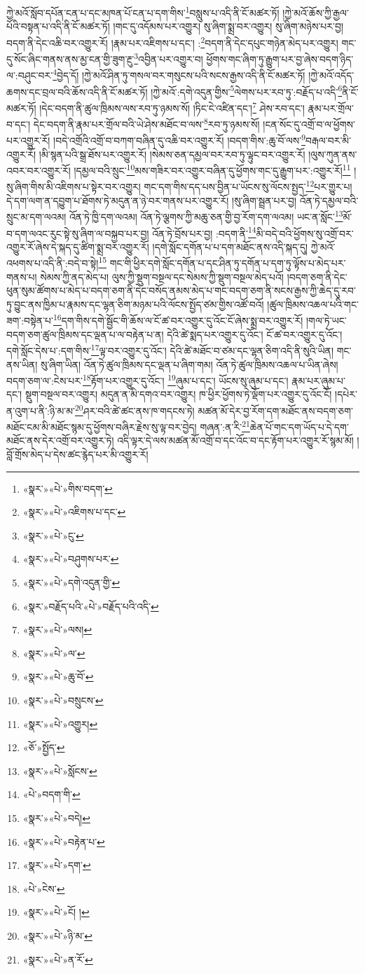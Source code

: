 ཀྱེ་མའོ་སློབ་དཔོན་ངན་པ་དང་མཁན་པོ་ངན་པ་དག་གིས་\footnote{«སྣར་»«པེ་»གིས་བདག་}བསླུས་པ་འདི་ནི་ངོ་མཚར་ཏོ། །ཀྱེ་མའོ་ཆོས་ཀྱི་རྒྱལ་པོའི་བསྟན་པ་འདི་ནི་ངོ་མཚར་ཏོ། །གང་དུ་འདོམས་པར་འགྱུར། སུ་ཞིག་སྨྲ་བར་འགྱུར། སུ་ཞིག་མཉེས་པར་བྱ། བདག་ནི་དེང་འཆི་བར་འགྱུར་རོ། །རྣམ་པར་འཇིགས་པ་དང་། :\footnote{«སྣར་»«པེ་»འཇིགས་པ་དང་}བདག་ནི་དེང་དཔུང་གཉེན་མེད་པར་འགྱུར། གང་དུ་སོང་ཞིང་གནས་ནས་མྱ་ངན་གྱི་ཟུག་རྔུ་\footnote{«སྣར་»«པེ་»ངུ་}འབྱིན་པར་འགྱུར་བ། ཕྱོགས་གང་ཞིག་ཏུ་རྒྱུག་པར་བྱ་ཞེས་བདག་ཉིད་ལ་:བཤུང་བར་\footnote{«སྣར་»«པེ་»བཤུགས་པར་}བྱེད་དོ། །ཀྱེ་མའོ་ཤིན་ཏུ་གསལ་བར་གསུངས་པའི་སངས་རྒྱས་འདི་ནི་ངོ་མཚར་ཏོ། །ཀྱེ་མའོ་འདོད་ཆགས་དང་བྲལ་བའི་ཆོས་འདི་ནི་ངོ་མཚར་ཏོ། །ཀྱེ་མའོ་:དགེ་འདུན་གྱིས་\footnote{«སྣར་»«པེ་»དགེ་འདུན་གྱི་}ལེགས་པར་རབ་ཏུ་:བརྗོད་པ་འདི་\footnote{«སྣར་»བརྗོད་པའི་«པེ་»བརྗོད་པའི་འདི་}ནི་ངོ་མཚར་ཏོ། །དེང་བདག་ནི་ཚུལ་ཁྲིམས་ལས་རབ་ཏུ་ཉམས་སོ། །ཏིང་ངེ་འཛིན་དང་།\footnote{«སྣར་»«པེ་»ལས།} ཤེས་རབ་དང་། རྣམ་པར་གྲོལ་བ་དང་། དེང་བདག་ནི་རྣམ་པར་གྲོལ་བའི་ཡེ་ཤེས་མཐོང་བ་ལས་\footnote{«སྣར་»«པེ་»ལ་}རབ་ཏུ་ཉམས་སོ། །ངན་སོང་དུ་འགྲོ་བ་ལ་ཕྱོགས་པར་འགྱུར་རོ། །བདེ་འགྲོའི་འགྲོ་བ་བཀག་བཞིན་དུ་འཆི་བར་འགྱུར་རོ། །བདག་གིས་:ཆུ་བོ་ལས་\footnote{«སྣར་»«པེ་»ཆུ་བོ་}བརྒལ་བར་མི་འགྱུར་རོ། །མི་སྙན་པའི་སྒྲ་ཐོས་པར་འགྱུར་རོ། །སེམས་ཅན་དམྱལ་བར་རབ་ཏུ་ལྟུང་བར་འགྱུར་རོ། །ལུས་ཀུན་ནས་འབར་བར་འགྱུར་རོ། །དམྱལ་བའི་སྲུང་\footnote{«སྣར་»«པེ་»བསྲུངས་}མས་གཟིར་བར་འགྱུར་བཞིན་དུ་ཕྱོགས་གང་དུ་རྒྱུག་པར་:འགྱུར་རོ།\footnote{«སྣར་»«པེ་»འགྱུར།} །སུ་ཞིག་གིས་མི་འཇིགས་པ་སྟེར་བར་འགྱུར། གང་དག་གིས་དད་པས་བྱིན་པ་ཡོངས་སུ་ལོངས་སྤྱད་\footnote{«ཅོ་»སྤྱོད་}པར་གྱུར་པ། དེ་དག་ལག་ན་དབྱུག་པ་ཐོགས་ཏེ་མདུན་ན་ཉེ་བར་གནས་པར་འགྱུར་རོ། །སུ་ཞིག་སྦྲན་པར་བྱ། འོན་ཏེ་དམྱལ་བའི་སྲུང་མ་དག་ལའམ། འོན་ཏེ་ཁྱི་དག་ལའམ། འོན་ཏེ་ལྕགས་ཀྱི་མཆུ་ཅན་གྱི་བྱ་རོག་དག་ལའམ། ཡང་ན་སློང་\footnote{«སྣར་»«པེ་»སློངས་}མོ་བ་དག་ལའང་རུང་སྟེ་སུ་ཞིག་ལ་བསྐྱབ་པར་བྱ། འོན་ཏེ་བྲོས་པར་བྱ། :བདག་ནི་\footnote{«པེ་»བདག་གི་}མི་བདེ་བའི་ཕྱོགས་སུ་འགྲོ་བར་འགྱུར་རོ་ཞེས་དེ་སྐད་དུ་ཚིག་སྨྲ་བར་འགྱུར་རོ། །དགེ་སློང་དགོན་པ་པ་དག་མཐོང་ནས་འདི་སྐད་དུ། ཀྱེ་མའོ་འཕགས་པ་འདི་ནི་:བདེ་བ་སྟེ།\footnote{«སྣར་»«པེ་»བདེ།} གང་གི་ཕྱིར་དགེ་སློང་དགོན་པ་དང་ཤིན་ཏུ་དགོན་པ་དག་ཏུ་ལྟོས་པ་མེད་པར་གནས་པ། སེམས་ཀྱི་ནད་མེད་པ། ལུས་ཀྱི་སྡུག་བསྔལ་དང་སེམས་ཀྱི་སྡུག་བསྔལ་མེད་པའོ། །བདག་ཅག་ནི་དེང་ཕུན་སུམ་ཚོགས་པ་མེད་པ་བདག་ཅག་ནི་དེང་བསོད་ནམས་མེད་པ་གང་བདག་ཅག་ནི་སངས་རྒྱས་ཀྱི་ཆེད་དུ་རབ་ཏུ་བྱུང་ནས་ཁྱིམ་པ་རྣམས་དང་ལྷན་ཅིག་མཉམ་པའི་ལོངས་སྤྱོད་ཙམ་གྱིས་འཚོ་བའོ། །ཚུལ་ཁྲིམས་འཆལ་པའི་གང་ཟག་:བསྟེན་པ་\footnote{«སྣར་»«པེ་»བརྟེན་པ་}དག་གིས་དགེ་སྦྱོང་གི་ཆོས་ལ་ངོ་ཚ་བར་འགྱུར་དུ་འོང་ངོ་ཞེས་སྨྲ་བར་འགྱུར་རོ། །གལ་ཏེ་ཡང་བདག་ཅག་ཚུལ་ཁྲིམས་དང་ལྡན་པ་ལ་བརྟེན་པ་ན། དེའི་ཚེ་སྨད་པར་འགྱུར་དུ་འོང་། ངོ་ཚ་བར་འགྱུར་དུ་འོང་། དགེ་སློང་དེས་པ་:དག་གིས་\footnote{«སྣར་»«པེ་»དག་}ལྟ་བར་འགྱུར་དུ་འོང་། དེའི་ཚེ་མཐོང་བ་ཙམ་དང་ལྷན་ཅིག་འདི་ནི་སུའི་ཡིན། གང་ནས་ཡིན། སུ་ཞིག་ཡིན། འོན་ཏེ་ཚུལ་ཁྲིམས་དང་ལྡན་པ་ཞིག་གམ། འོན་ཏེ་ཚུལ་ཁྲིམས་འཆལ་པ་ཡིན་ཞེས། བདག་ཅག་ལ་:ངེས་པར་\footnote{«པེ་»ངེས་}རྟོག་པར་འགྱུར་དུ་འོང་། \footnote{«སྣར་»«པེ་»ངོ། ། }ཞུམ་པ་དང་། ཡོངས་སུ་ཞུམ་པ་དང་། རྣམ་པར་ཞུམ་པ་དང་། སྡུག་བསྔལ་བར་འགྱུར། མདུན་ན་མི་དགའ་བར་འགྱུར། ཁ་ཕྱིར་ཕྱོགས་ཏེ་ལྡོག་པར་འགྱུར་དུ་འོང་ངོ། །དཔེར་ན་འུག་པ་ནི་:ཉི་མ་མ་\footnote{«སྣར་»«པེ་»ཉི་མ་}ཤར་བའི་ཚེ་ཚང་ནས་ཁ་གདངས་ཏེ། མཚན་མོ་དེར་བྱ་རོག་དག་མཐོང་ནས་བདག་ཅག་མཐོང་ངམ་མི་མཐོང་སྙམ་དུ་ཕྱོགས་བཞིར་རྗེས་སུ་ལྟ་བར་བྱེད། གཞན་:ན་རི་\footnote{«སྣར་»«པེ་»ན་རོ་}ཆེན་པོ་གང་དག་ཡོད་པ་དེ་དག་མཐོང་ནས་དེར་འགྲོ་བར་འགྱུར་ཏེ། འདི་ལྟར་དེ་ལས་མཚན་མོ་འགྲོ་བ་དང་འོང་བ་དང་རྟོག་པར་འགྱུར་རོ་སྙམ་མོ། །བློ་གྲོས་མེད་པ་དེས་ཚང་རྙེད་པར་མི་འགྱུར་རོ། 